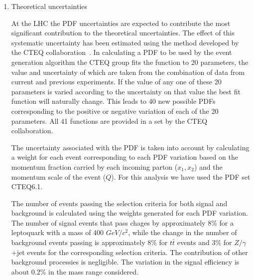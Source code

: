 \begin{enumerate}

\item Theoretical uncertainties 

At the LHC the PDF uncertainties are expected to contribute the most significant
contribution to the theoretical uncertainties.  
The effect of this systematic uncertainty has been estimated
using the method developed by the CTEQ collaboration~\cite{PDFRescaling,Martin:2003sk}.
In calculating a PDF to be used by the event generation algorithm the CTEQ group fits
the function to 20 parameters, the value and uncertainty of which are taken from the
combination of data from current and previous experiments.
If the value of any one of these 20 parameters is varied according to the uncertainty on that value 
the best fit function will naturally change.  This leads to 40 new possible PDFs corresponding to the positive or
negative variation of each of the 20 parameters.  All 41 functions are provided in a set by the CTEQ collaboration.

The uncertainty associated with the PDF is taken into account by calculating
a weight for each event corresponding to each PDF variation 
based on the momentum fraction carried by each incoming parton ($x_1, x_2$) 
and the momentum scale of the event ($Q$).  
For this analysis we have used the PDF set CTEQ6.1.

The number of events passing the selection criteria for both signal and background 
is calculated using the weights generated for each PDF variation.  
The number of signal events that pass chages by approximately 8\% for a leptoquark with a mass of 400 $GeV/c^2$, 
while the change in the number of background events
passing is approximately 8\% for $t\bar{t}$ events and 3\% for $Z/\gamma$+jet 
events for the corresponding selection criteria.
The contribution of other background processies is negligible.   
The variation in the signal efficiency is about 0.2\% in the mass range considered.


\end{enumerate}
